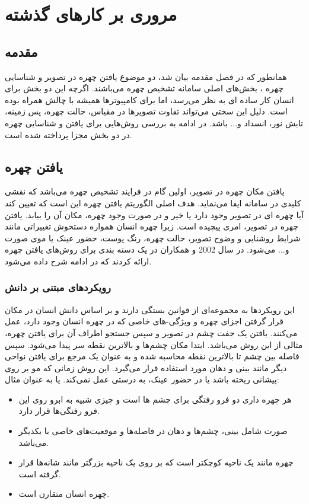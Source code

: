 \chapter{ مروری بر کارهای گذشته}

\section{مقدمه}
همانطور که در فصل مقدمه بیان شد، دو موضوع یافتن چهره  در تصویر و شناسایی چهره ، بخش‌های اصلی سامانه تشخیص چهره می‌باشند. اگرچه این دو بخش برای انسان کار ساده ای به نظر می‌رسد، اما برای کامپیوتر‌ها همیشه با چالش همراه بوده است. دلیل این سختی می‌تواند تفاوت تصویرها در مقیاس، حالت چهره، پس زمینه، تابش نور، انسداد و... باشد. در ادامه به بررسی روش‌هایی برای یافتن و شناسایی چهره در دو بخش مجزا پرداخته شده است.
\section{یافتن چهره}
یافتن مکان چهره در تصویر، اولین گام در فرایند تشخیص چهره می‌باشد که نقشی کلیدی در سامانه ایفا می‌نماید. هدف اصلی الگوریتم‌ یافتن چهره این است که تعیین کند آیا چهره ای در تصویر وجود دارد یا خیر و در صورت وجود چهره، مکان آن را بیابد. یافتن چهره در تصویر، امری پیچیده است. زیرا چهره انسان همواره دستخوش تغییراتی مانند شرایط روشنایی و وضوح تصویر، حالت چهره، رنگ پوست، حضور عینک یا موی صورت و... می‌شود. در سال 2002  و همکاران در \cite{982883} یک دسته بندی برای روش‌های یافتن چهره ارائه کردند که در ادامه شرح داده می‌شود.

\subsection{رویکردهای مبتنی بر دانش}
این رویکردها به مجموعه‌ای از قوانین بستگی دارند و بر اساس دانش انسان در مکان قرار گرفتن اجزای چهره و ویژگی-های خاصی که در چهره انسان وجود دارد، عمل می‌کنند. یافتن یک جفت چشم در تصویر و سپس جستجو اطراف آن برای یافتن چهره، مثالی از این روش می‌باشد. ابتدا مکان چشم‌ها و بالاترین نقطه سر پیدا می‌شود. سپس فاصله بین چشم تا بالاترین نقطه محاسبه شده و به عنوان یک مرجع برای یافتن نواحی دیگر مانند بینی و دهان مورد استفاده قرار می‌گیرد. این روش زمانی که مو بر روی پیشانی ریخته باشد یا در حضور عینک، به درستی عمل نمی‌کند. یا به عنوان مثال:


\begin{itemize}
\item
 هر چهره داری دو فرو رفتگی برای چشم ها است و چیزی شبیه به ابرو روی این فرو رفتگی‌ها قرار دارد.
 \item
صورت شامل بینی، چشم‌ها و دهان در فاصله‌ها و موقعیت‌های خاصی با یکدیگر می‌باشد.
 \item
چهره مانند یک ناحیه کوچکتر است که بر روی یک ناحیه بزرگتر مانند شانه‌ها قرار گرفته است. 
 \item
چهره انسان متقارن است.

\end{itemize} 
	
